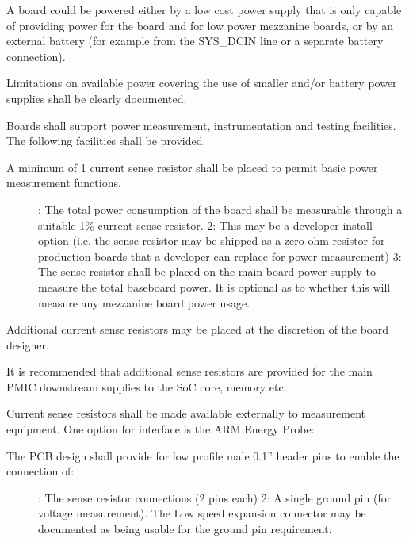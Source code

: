 \documentclass[a4paper,10pt,oneside,english]{sphinxmanual}
\begin{document}
\sphinxAtStartPar
{}

\sphinxAtStartPar
A board could be powered either by a low cost power supply that is only capable of providing power for the board and for low power mezzanine boards, or by an external battery (for example from the SYS\_DCIN line or a separate battery connection).

\sphinxAtStartPar
Limitations on available power covering the use of smaller and/or battery power supplies shall be clearly documented.

\sphinxAtStartPar
{}

\sphinxAtStartPar
Boards shall support power measurement, instrumentation and testing facilities. The following facilities shall be provided.

\sphinxAtStartPar
{}
\begin{description}
\item[{A minimum of 1 current sense resistor shall be placed to permit basic power measurement functions.}] \leavevmode
{}: The total power consumption of the board shall be measurable through a suitable 1\% current sense resistor.
2: This may be a developer install option (i.e. the sense resistor may be shipped as a zero ohm resistor for production boards that a developer can replace for power measurement)
3: The sense resistor shall be placed on the main board power supply to measure the total baseboard power. It is optional as to whether this will measure any mezzanine board power usage.

\end{description}

\sphinxAtStartPar
Additional current sense resistors may be placed at the discretion of the board designer.

\sphinxAtStartPar
It is recommended that additional sense resistors are provided for the main PMIC downstream supplies to the SoC core, memory etc.

\sphinxAtStartPar
Current sense resistors shall be made available externally to measurement equipment. One option for interface is the ARM Energy Probe:

\sphinxAtStartPar
{}
\begin{description}
\item[{The PCB design shall provide for low profile male 0.1” header pins to enable the connection of:}] \leavevmode
{}: The sense resistor connections (2 pins each)
2: A single ground pin (for voltage measurement). The Low speed expansion connector may be documented as being usable for the ground pin requirement.

\end{description}
\end{document}
